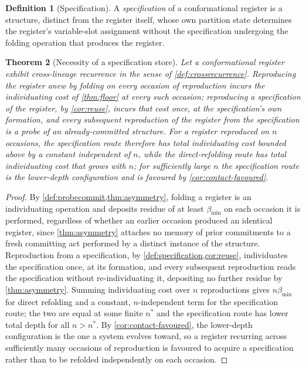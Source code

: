 \documentclass[11pt,twocolumn,a4paper]{article}
\theoremstyle{plain}
\newtheorem{theorem}{Theorem}[section]
\theoremstyle{definition}
\newtheorem{definition}[theorem]{Definition}
\theoremstyle{remark}
\newcommand{\thick}{\beta}
\newcommand{\floor}{\thick_{\min}}
\begin{document}
\begin{definition}[Specification]
\label{def:specification}
A \emph{specification} of a conformational register is a structure,
distinct from the register itself, whose own partition state determines
the register's variable-slot assignment without the specification
undergoing the folding operation that produces the register.
\end{definition}

\begin{theorem}[Necessity of a specification store]
\label{thm:specification-necessity}
Let a conformational register exhibit cross-lineage recurrence in the
sense of \cref{def:crossrecurrence}. Reproducing the register anew by
folding on every occasion of reproduction incurs the individuating cost of
\cref{thm:floor} at every such occasion; reproducing a specification of
the register, by \cref{cor:reuse}, incurs that cost once, at the
specification's own formation, and every subsequent reproduction of the
register from the specification is a probe of an already-committed
structure. For a register reproduced on $n$ occasions, the specification
route therefore has total individuating cost bounded above by a constant
independent of $n$, while the direct-refolding route has total
individuating cost that grows with $n$; for sufficiently large $n$ the
specification route is the lower-depth configuration and is favoured by
\cref{cor:contact-favoured}.
\end{theorem}

\begin{proof}
By \cref{def:probecommit,thm:asymmetry}, folding a register is an
individuating operation and deposits residue of at least $\floor$ on each
occasion it is performed, regardless of whether an earlier occasion
produced an identical register, since \cref{thm:asymmetry} attaches no
memory of prior commitments to a fresh committing act performed by a
distinct instance of the structure. Reproduction from a specification, by
\cref{def:specification,cor:reuse}, individuates the specification once,
at its formation, and every subsequent reproduction reads the
specification without re-individuating it, depositing no further residue
by \cref{thm:asymmetry}. Summing individuating cost over $n$ reproductions
gives $n\floor$ for direct refolding and a constant, $n$-independent term
for the specification route; the two are equal at some finite $n^{\ast}$
and the specification route has lower total depth for all $n > n^{\ast}$.
By \cref{cor:contact-favoured}, the lower-depth configuration is the one a
system evolves toward, so a register recurring across sufficiently many
occasions of reproduction is favoured to acquire a specification rather
than to be refolded independently on each occasion.
\end{proof}
\end{document}
